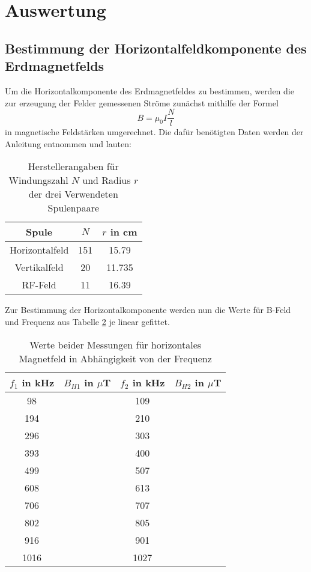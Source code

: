 \section{Auswertung}
\label{sec:Auswertung}
\subsection{Bestimmung der Horizontalfeldkomponente des Erdmagnetfelds}
\label{subsec:erdbfeld}
Um die Horizontalkomponente des Erdmagnetfeldes zu bestimmen, werden die zur erzeugung der Felder gemessenen Ströme zunächst mithilfe der Formel
\begin{equation}
  B = \mu_0 I \frac{N}{l}
  \label{eqn:Spulenbfeld}
\end{equation}
in magnetische Feldstärken umgerechnet.
Die dafür benötigten Daten werden der Anleitung\cite{Anleitung} entnommen und lauten:
\begin{table}[H]
  \centering
  \caption{Herstellerangaben für Windungszahl $N$ und Radius $r$ der drei Verwendeten Spulenpaare}
  \label{tab:Spulendaten}
  \begin{tabular}{c|c|c}
    Spule & $N$ &$r$ in cm\\
    \hline
    Horizontalfeld& 151 & 15.79\\
    Vertikalfeld  & 20  & 11.735\\
    RF-Feld       & 11  & 16.39\\
  \end{tabular}
\end{table}
Zur Bestimmung der Horizontalkomponente werden nun die Werte für B-Feld und Frequenz aus Tabelle \ref{tab:messung} je linear gefittet.
\begin{table}
  \centering
  \caption{Werte beider Messungen für horizontales Magnetfeld in Abhängigkeit von der Frequenz}
  \label{tab:messung}
  \begin{tabular}{|c|c|c|c|}
    $f_1$ in kHz & $B_{H1}$ in $\mu$T &$f_2$ in kHz & $B_{H2}$ in $\mu$T\\
    \hline
     98& & 109& \\
     194& & 210&\\
     296& & 303&\\
     393& & 400&\\
     499& & 507&\\
     608& & 613&\\
     706& & 707&\\
     802& & 805&\\
     916& & 901&\\
     1016& & 1027&\\
  \end{tabular}
\end{table}
